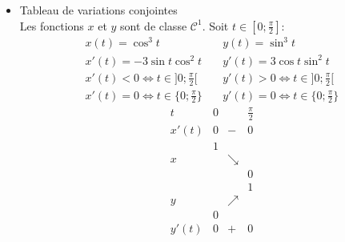 {\begin{enumerate}
{\begin{itemize}
On constate que $x(\pi-t)=-x(t)$ et que $y(\pi-t)=y(t)$, par conséquent les points $M(\frac{\pi}{2}-t)$ et $M(\frac{\pi}{2}+t)$ sont symétriques par rapport à l'axe $(Oy)$: on restreint donc l'étude à $[0;\frac{\pi}{2}]$, puis on complète par symétrie par rapport à $(Oy)$.\\
 puis on complète
en utilisant successivement les symétries par rapport à $(Oy)$ et $(Ox)$.
\item Tableau de variations conjointes\\
Les fonctions $x$ et $y$ sont de classe $\mathcal{C}^1$. Soit $t\in[0;\frac{\pi}{2}]$:
$$\begin{array}{lcl}
x(t)=\cos^3t&\ &y(t)=\sin^3t\\
x'(t)=-3\sin t\cos^2t&\ &y'(t)=3\cos t\sin^2t\\
x'(t)<0\Longleftrightarrow t\in]0;\frac{\pi}{2}[&\ &y'(t)>0\Longleftrightarrow t\in]0;\frac{\pi}{2}[\\
x'(t)=0\Longleftrightarrow t\in\{0;\frac{\pi}{2}\} &\ &y'(t)=0\Longleftrightarrow t\in\{0;\frac{\pi}{2}\}
\end{array}$$
$$\begin{array}{c|lcr}
t&0&\ &\frac{\pi}{2}\\\hline
x'(t)&0&-&0\\\hline
\ &1 &\ &\ \\
x&\ &\searrow &\ \\
\ & &\ &0 \\\hline
\ &\ &\ &1 \\
y&\ &\nearrow &\ \\
\ &0 &\ & \\\hline
y'(t)&0&+&0\\
\end{array}$$


\end{itemize}}
\end{enumerate}}
